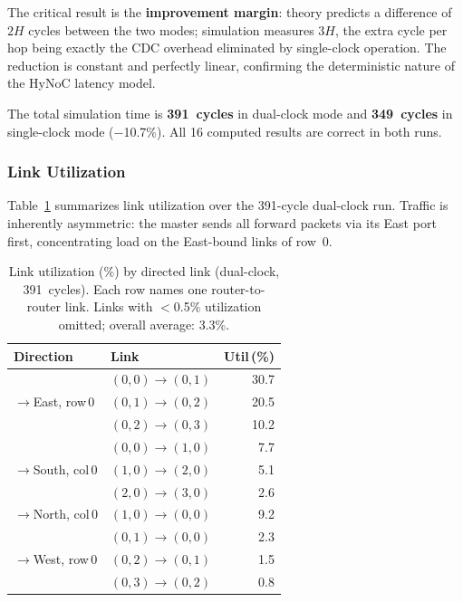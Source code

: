 The critical result is the \textbf{improvement margin}: theory predicts a
difference of $2H$ cycles between the two modes; simulation measures $3H$,
the extra cycle per hop being exactly the CDC overhead eliminated by
single-clock operation.  The reduction is constant and perfectly linear,
confirming the deterministic nature of the HyNoC latency model.

The total simulation time is \textbf{391~cycles} in dual-clock mode and
\textbf{349~cycles} in single-clock mode ($-$10.7\%).  All 16 computed
results are correct in both runs.

\subsubsection{Link Utilization}

Table~\ref{tab:links} summarizes link utilization over the 391-cycle dual-clock run.
Traffic is inherently asymmetric: the master sends all forward packets via its East
port first, concentrating load on the East-bound links of row~0.

\begin{table}[h]
\centering
\footnotesize
\setlength{\tabcolsep}{4pt}
\caption{Link utilization (\%) by directed link (dual-clock, 391~cycles).
         Each row names one router-to-router link.
         Links with $<$0.5\% utilization omitted; overall average: 3.3\%.}
\label{tab:links}
\begin{tabular}{@{}llr@{}}
\toprule
Direction & Link & Util\,(\%) \\
\midrule
\multirow{3}{*}{$\to$East, row\,0}
  & $(0,0)\!\to\!(0,1)$ & 30.7 \\
  & $(0,1)\!\to\!(0,2)$ & 20.5 \\
  & $(0,2)\!\to\!(0,3)$ & 10.2 \\
\cmidrule(l){1-3}
\multirow{3}{*}{$\to$South, col\,0}
  & $(0,0)\!\to\!(1,0)$ &  7.7 \\
  & $(1,0)\!\to\!(2,0)$ &  5.1 \\
  & $(2,0)\!\to\!(3,0)$ &  2.6 \\
\cmidrule(l){1-3}
$\to$North, col\,0
  & $(1,0)\!\to\!(0,0)$ &  9.2 \\
\cmidrule(l){1-3}
\multirow{3}{*}{$\to$West, row\,0}
  & $(0,1)\!\to\!(0,0)$ &  2.3 \\
  & $(0,2)\!\to\!(0,1)$ &  1.5 \\
  & $(0,3)\!\to\!(0,2)$ &  0.8 \\
\bottomrule
\end{tabular}
\end{table}

